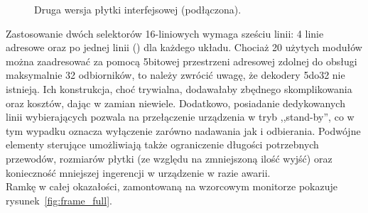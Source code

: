 \begin{figure}
 \centering
 \caption[Druga wersja płytki interfejsowej]{Druga wersja płytki interfejsowej (podłączona).}
 \label{fig:second_interface}
\end{figure}

Zastosowanie dwóch selektorów 16-liniowych wymaga sześciu linii: 4 linie adresowe oraz po jednej linii  () dla każdego układu.
Chociaż 20 użytych modułów można zaadresować za pomocą 5\ppauza{}bitowej przestrzeni adresowej zdolnej do obsługi maksymalnie 32 odbiorników, to należy zwrócić uwagę, że dekodery 5\ppauza{}do\ppauza{}32 nie istnieją.
Ich konstrukcja, choć trywialna, dodawałaby zbędnego skomplikowania oraz kosztów, dając w zamian niewiele.
Dodatkowo, posiadanie dedykowanych linii wybierających pozwala na przełączenie urządzenia w tryb ,,stand-by'', co w tym wypadku oznacza wyłączenie zarówno nadawania jak i odbierania.
Podwójne elementy sterujące umożliwiają także ograniczenie długości potrzebnych przewodów, rozmiarów płytki (ze względu na zmniejszoną ilość wyjść) oraz konieczność mniejszej ingerencji w urządzenie w razie awarii.\\

Ramkę w całej okazałości, zamontowaną na wzorcowym monitorze pokazuje rysunek~\ref{fig:frame_full}.

